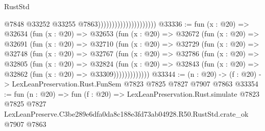 \begin{lexlean}{RustStd}
\begin{coremodule}
                                              @7848
                                              @33252
                                              @33255
                                              @7863)))))))))))))))))))))
@33336 := fun (x : @20) =>
  @32634
    (fun (x : @20) =>
    @32653
      (fun (x : @20) =>
      @32672
        (fun (x : @20) =>
        @32691
          (fun (x : @20) =>
          @32710
            (fun (x : @20) =>
            @32729
              (fun (x : @20) =>
              @32748
                (fun (x : @20) =>
                @32767
                  (fun (x : @20) =>
                  @32786
                    (fun (x : @20) =>
                    @32805
                      (fun (x : @20) =>
                      @32824
                        (fun (x : @20) =>
                        @32843 (fun (x : @20) => @32862 (fun (x : @20) => @33309)))))))))))))
@33344 := (n : @20) -> (f : @20) -> LexLeanPreservation.Rust.FunSem @7823 @7825 @7827 @7907 @7863
@33354 := fun (n : @20) =>
  fun (f : @20) =>
  LexLeanPreservation.Rust.simulate
    @7823
    @7825
    @7827
    LexLeanPreserve.C3be289e6dfa0da8c188e3fd73ab04928.R50.RustStd.crate_ok
    @7907
    @7863
\end{coremodule}
\end{lexlean}
